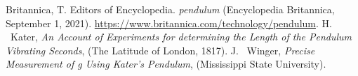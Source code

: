 \documentclass[aps,prl,10pt,twocolumn,floatfix]{revtex4-2}
\begin{document}
\begin{thebibliography}{9}
 Britannica, T. Editors of Encyclopedia. \textit{pendulum} (Encyclopedia Britannica, September 1, 2021). \url{https://www.britannica.com/technology/pendulum}.
 H. ~Kater, \textit{An Account of Experiments for determining the Length of the Pendulum Vibrating Seconds}, (The Latitude of London, 1817).
 J. ~Winger, \textit{Precise Measurement of g Using Kater’s Pendulum}, (Mississippi State University).
\end{thebibliography}
\end{document}
